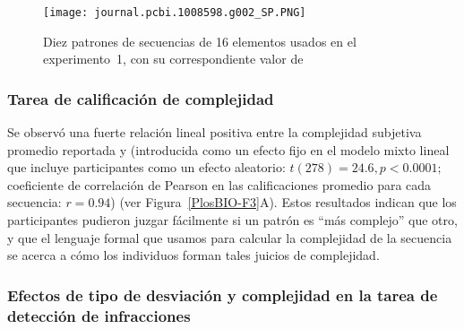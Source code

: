 \begin{figure}[t!]
   \texttt{[image: journal.pcbi.1008598.g002\_SP.PNG]}
   \centering
   \caption{Diez patrones de secuencias de 16 elementos usados en el experimento~1, con su correspondiente valor de \mdlbin}
   \label{PlosBIO-F2}
\end{figure}

\subsubsection*{Tarea de calificación de complejidad}


Se observó una fuerte relación lineal positiva entre la complejidad subjetiva promedio reportada y \mdlbin (introducida como un efecto fijo en el modelo mixto lineal que incluye participantes como un efecto aleatorio: $t (278) = 24.6, p < 0.0001;$ coeficiente de correlación de Pearson en las calificaciones promedio para cada secuencia: $r = 0.94$) (ver Figura~\ref{PlosBIO-F3}A). Estos resultados indican que los participantes pudieron juzgar fácilmente si un patrón es ``más complejo'' que otro, y que el lenguaje formal que usamos para calcular la complejidad de la secuencia se acerca a cómo los individuos forman tales juicios de complejidad.

\subsubsection*{Efectos de tipo de desviación y complejidad en la tarea de detección de infracciones}

